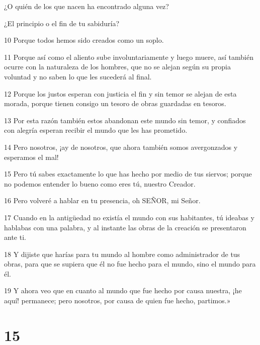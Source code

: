 \par ¿O quién de los que nacen ha encontrado alguna vez?

\par ¿El principio o el fin de tu sabiduría?


\par 10 Porque todos hemos sido creados como un soplo.

\par 11 Porque así como el aliento sube involuntariamente y luego muere, así también ocurre con la naturaleza de los hombres, que no se alejan según su propia voluntad y no saben lo que les sucederá al final.

\par 12 Porque los justos esperan con justicia el fin y sin temor se alejan de esta morada, porque tienen consigo un tesoro de obras guardadas en tesoros.

\par 13 Por esta razón también estos abandonan este mundo sin temor, y confiados con alegría esperan recibir el mundo que les has prometido.

\par 14 Pero nosotros, ¡ay de nosotros, que ahora también somos avergonzados y esperamos el mal!

\par 15 Pero tú sabes exactamente lo que has hecho por medio de tus siervos; porque no podemos entender lo bueno como eres tú, nuestro Creador.

\par 16 Pero volveré a hablar en tu presencia, oh SEÑOR, mi Señor.

\par 17 Cuando en la antigüedad no existía el mundo con sus habitantes, tú ideabas y hablabas con una palabra, y al instante las obras de la creación se presentaron ante ti.

\par 18 Y dijiste que harías para tu mundo al hombre como administrador de tus obras, para que se supiera que él no fue hecho para el mundo, sino el mundo para él.

\par 19 Y ahora veo que en cuanto al mundo que fue hecho por causa nuestra, ¡he aquí! permanece; pero nosotros, por causa de quien fue hecho, partimos.»

\chapter{15}

